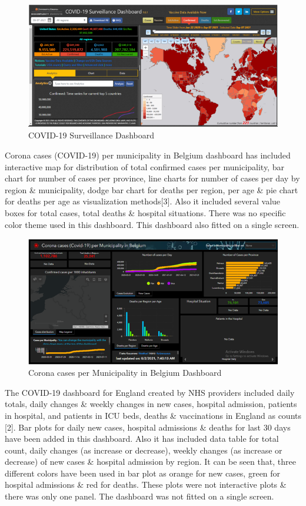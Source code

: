 \documentclass[
]{article}
\begin{document}
\begin{figure}
\includegraphics[width=8.42in]{Images/3} \caption{COVID-19 Surveillance Dashboard}\label{fig:unnamed-chunk-10}
\end{figure}

Corona cases (COVID-19) per municipality in Belgium dashboard has
included interactive map for distribution of total confirmed cases per
municipality, bar chart for number of cases per province, line charts
for number of cases per day by region \& municipality, dodge bar chart
for deaths per region, per age \& pie chart for deaths per age as
visualization methods{[}3{]}. Also it included several value boxes for
total cases, total deaths \& hospital situations. There was no specific
color theme used in this dashboard. This dashboard also fitted on a
single screen.

\begin{figure}
\includegraphics[width=8.39in]{Images/4} \caption{Corona cases per Municipality in Belgium Dashboard}\label{fig:unnamed-chunk-11}
\end{figure}

The COVID-19 dashboard for England created by NHS providers included
daily totals, daily changes \& weekly changes in new cases, hospital
admission, patients in hospital, and patients in ICU beds, deaths \&
vaccinations in England as counts {[}2{]}. Bar plots for daily new
cases, hospital admissions \& deaths for last 30 days have been added in
this dashboard. Also it has included data table for total count, daily
changes (as increase or decrease), weekly changes (as increase or
decrease) of new cases \& hospital admission by region. It can be seen
that, three different colors have been used in bar plot as orange for
new cases, green for hospital admissions \& red for deaths. These plots
were not interactive plots \& there was only one panel. The dashboard
was not fitted on a single screen.
\end{document}
